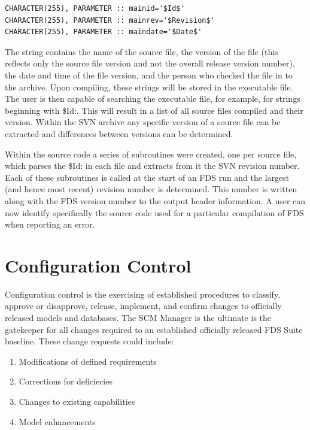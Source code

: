 \documentclass[11pt]{book}
\begin{document}
\footnotesize
\begin{verbatim}
CHARACTER(255), PARAMETER :: mainid='$Id$'
CHARACTER(255), PARAMETER :: mainrev='$Revision$'
CHARACTER(255), PARAMETER :: maindate='$Date$'
\end{verbatim}
\normalsize

The string contains the name of the source file, the version of the file (this reflects only the source
file version and not the overall release version number), the date and time of the file version, and
the person who checked the file in to the archive.  Upon compiling, these strings will be stored in the
executable file.  The user is then capable of searching the executable file, for example, for strings
beginning with {\ct \$Id:}.  This will result in a list of all source files compiled and their version.
Within the SVN archive any specific version of a source file can be extracted and differences between
versions can be determined.

Within the source code a series of subroutines were created, one per source file, which parses the {\ct \$Id:} in
each file and extracts from it the SVN revision number.  Each of these subroutines is called at the start
of an FDS run and the largest (and hence most recent) revision number is determined.  This number is written
along with the FDS version number to the output header information.  A user can now identify specifically
the source code used for a particular compilation of FDS when reporting an error.

\section{Configuration Control}

Configuration control is the exercising of established procedures to classify, approve or disapprove, release,
implement, and confirm changes to officially released models and databases.  The SCM Manager is the
ultimate is the gatekeeper for all changes required to an established officially released FDS Suite baseline.
These change requests could include:

\begin{enumerate}

\item Modifications of defined requirements

\item Corrections for deficiecies

\item Changes to existing capabilities 

\item Model enhancements

\end{enumerate}
\end{document}
